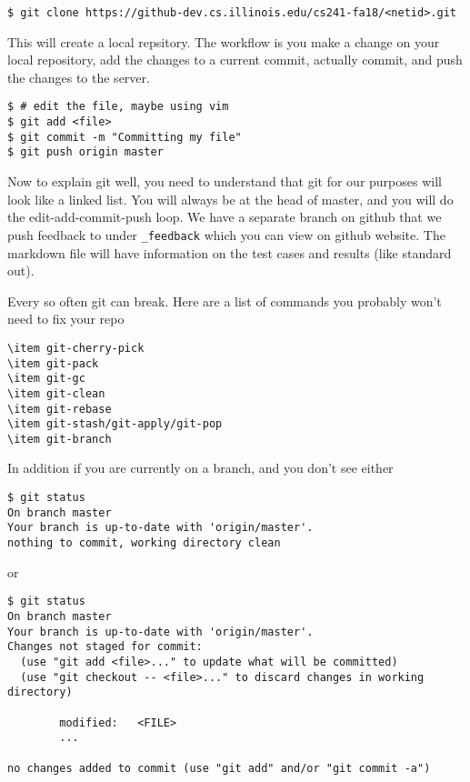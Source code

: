 \begin{lstlisting}
$ git clone https://github-dev.cs.illinois.edu/cs241-fa18/<netid>.git
\end{lstlisting}

This will create a local repsitory. The workflow is you make a change on your local repository, add the changes to a current commit, actually commit, and push the changes to the server.

\begin{lstlisting}
$ # edit the file, maybe using vim
$ git add <file>
$ git commit -m "Committing my file"
$ git push origin master
\end{lstlisting}

Now to explain git well, you need to understand that git for our purposes will look like a linked list.
You will always be at the head of master, and you will do the edit-add-commit-push loop. We have a separate branch on github that we push feedback to under \texttt{_feedback} which you can view on github website. The markdown file will have information on the test cases and results (like standard out).

Every so often git can break. Here are a list of commands you probably won't need to fix your repo

\begin{lstlisting}
\item git-cherry-pick
\item git-pack
\item git-gc
\item git-clean
\item git-rebase
\item git-stash/git-apply/git-pop
\item git-branch
\end{lstlisting}

In addition if you are currently on a branch, and you don't see either

\begin{lstlisting}
$ git status
On branch master
Your branch is up-to-date with 'origin/master'.
nothing to commit, working directory clean
\end{lstlisting} 

or

\begin{lstlisting}
$ git status
On branch master
Your branch is up-to-date with 'origin/master'.
Changes not staged for commit:
  (use "git add <file>..." to update what will be committed)
  (use "git checkout -- <file>..." to discard changes in working directory)

        modified:   <FILE>
        ...

no changes added to commit (use "git add" and/or "git commit -a")
\end{lstlisting}

